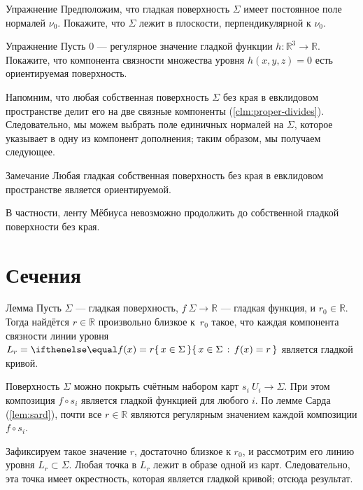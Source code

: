 {\sloppy

\begin{thm}{Упражнение}\label{ex:const-normal}
Предположим, что гладкая поверхность $\Sigma$ имеет постоянное поле нормалей $\nu_0$.
Покажите, что $\Sigma$ лежит в плоскости, перпендикулярной к $\nu_0$.
\end{thm}

}

\begin{thm}{Упражнение}\label{ex:implicit-orientable}
Пусть $0$ --- регулярное значение гладкой функции
$h:\mathbb{R}^3\to\mathbb{R}$.
Покажите, что компонента связности множества уровня $h(x,y,z)=0$ есть ориентируемая поверхность.
\end{thm}

Напомним, что любая собственная поверхность $\Sigma$ без края в евклидовом пространстве делит его на две связные компоненты (\ref{clm:proper-divides}).
Следовательно, мы можем выбрать поле единичных нормалей на $\Sigma$, которое указывает в одну из компонент дополнения; таким образом, мы получаем следующее.

\begin{thm}{Замечание}
Любая гладкая собственная поверхность без края в евклидовом пространстве является ориентируемой.
\end{thm}

В частности, ленту Мёбиуса невозможно продолжить до собственной гладкой поверхности без края.

\section{Сечения}

\begin{thm}{Лемма}\label{lem:reg-section}
Пусть $\Sigma$ --- гладкая поверхность, $f\:\Sigma\to\mathbb{R}$ --- гладкая функция, и $r_0\in\mathbb{R}$.
Тогда найдётся $r\in\mathbb{R}$ произвольно близкое к~$r_0$ такое, что каждая компонента связности линии уровня $L_r\z=\set{x\in\Sigma}{f(x)=r}$ является гладкой кривой.
\end{thm}

Поверхность $\Sigma$ можно покрыть счётным набором карт $s_i\:U_i\to \Sigma$.
При этом композиция $f\circ s_i$ является гладкой функцией для любого $i$.
По лемме Сарда (\ref{lem:sard}), почти все $r\in \mathbb{R}$ являются регулярным значением каждой композиции $f\circ s_i$.

Зафиксируем такое значение $r$, достаточно близкое к $r_0$, и рассмотрим его линию уровня $L_r\subset\Sigma$.
Любая точка в $L_r$ лежит в образе одной из карт.
Следовательно, эта точка имеет окрестность, которая является гладкой кривой;
отсюда результат.
\qeds

